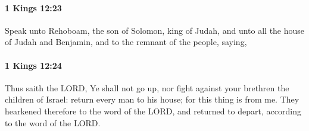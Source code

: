 		\paragraph{1 Kings 12:23} %
			\label{1KINGS-12-23}

			Speak unto Rehoboam, the son of Solomon, king of Judah, and unto all the house of Judah and Benjamin, and to the remnant of the people, saying,


		\paragraph{1 Kings 12:24} %
			\label{1KINGS-12-24}

			Thus saith the LORD, Ye shall not go up, nor fight against your brethren the children of Israel: return every man to his house; for this thing is from me. They hearkened therefore to the word of the LORD, and returned to depart, according to the word of the LORD.

